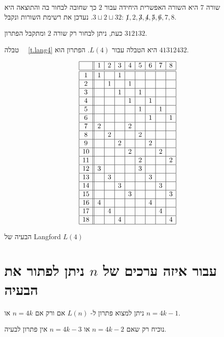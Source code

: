 שורה
$7$
היא השורה האפשרית היחידה עבור
$2$
כך שחובה לבחור בה והתוצאה היא
$3\sqcup  2\sqcup  3{}2$.
נעדכן את רשימת השורות ונקבל:
$\not 1,2,\not 3,\not 4,\not 5, \not 6, 7, 8$.

כעת, ניתן לבחור רק שורה
$2$
ומתקבל הפתרון
$3{}1{}2{}1{}3{}2$.

טבלה~%
~\ref{t.lang4}
היא הטבלה עבור
$L(4)$.
הפתרון הוא
$41312432$.

\begin{table}
\[
\begin{array}{|c||c|c|c|c|c|c|c|c|}
\hline
&1&2&3&4&5&6&7&8\\\hline\hline
1&1&&1&&&&&\\\hline
2&&1&&1&&&&\\\hline
3&&&1&&1&&&\\\hline
4&&&&1&&1&&\\\hline
5&&&&&1&&1&\\\hline
6&&&&&&1&&1\\\hline
7&2&&&2&&&&\\\hline
8&&2&&&2&&&\\\hline
9&&&2&&&2&&\\\hline
10&&&&2&&&2&\\\hline
11&&&&&2&&&2\\\hline
12&3&&&&3&&&\\\hline
13&&3&&&&3&&\\\hline
14&&&3&&&&3&\\\hline
15&&&&3&&&&3\\\hline
16&4&&&&&4&&\\\hline
17&&4&&&&&4&\\\hline
18&&&4&&&&&4\\\hline
\end{array}
\]
\caption{הבעיה של Langford $L(4)$}\label{t.lang4}
\end{table}

\section{
עבור איזה ערכים של
$n$
ניתן לפתור את הבעיה}
\label{s.langford-theorem}

\begin{theorem} \label{thm.langford}
ניתן למצוא פתרון ל-%
$L(n)$
אם ורק אם
$n=4k$
או
$n=4k-1$.
\end{theorem}
נוכיח רק שאם 
$n=4k-2$
או
$n=4k-3$
אין פתרון לבעיה.

